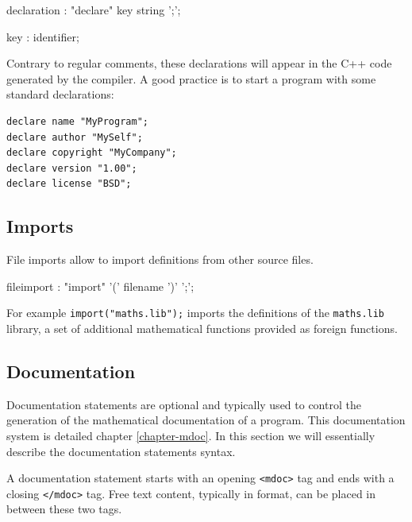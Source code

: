 \begin{rail}
declaration : "declare" key string ';';
\end{rail}

\begin{rail}
key : identifier;
\end{rail}

Contrary to regular comments, these declarations will appear in the C++ code generated by the compiler. A good practice is to start a \faust program with some standard declarations:
\begin{lstlisting}
declare name "MyProgram";
declare author "MySelf";
declare copyright "MyCompany";
declare version "1.00";
declare license "BSD"; 
\end{lstlisting}

\subsection{Imports}

File imports allow to import definitions from other source files.  


\begin{rail}
fileimport : "import" '(' filename ')' ';';
\end{rail}

For example \lstinline{import("maths.lib");} imports the definitions of the \lstinline{maths.lib} library, a set of additional mathematical functions provided as foreign functions.

\subsection{Documentation}
\label{sec-documentation}

Documentation statements are optional and typically used to control the generation of the mathematical documentation of a \faust program. This documentation system is detailed chapter \ref{chapter-mdoc}. In this section we will essentially describe the documentation statements syntax.

A documentation statement starts with an opening \lstinline'<mdoc>' tag and ends with a closing \lstinline'</mdoc>' tag. Free text content, typically in \latex format, can be placed in between these two tags. 

